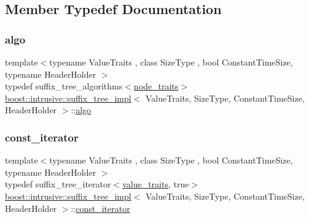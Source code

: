\subsection{Member Typedef Documentation}
\mbox{\label{classboost_1_1intrusive_1_1suffix__tree__impl_a3e079dda4e4422ad9c911470f3e8c7e2}} 
\subsubsection{\texorpdfstring{algo}{algo}}
{\footnotesize\ttfamily template$<$typename Value\+Traits , class Size\+Type , bool Constant\+Time\+Size, typename Header\+Holder $>$ \\
typedef suffix\+\_\+tree\+\_\+algorithms$<$\hyperlink{classboost_1_1intrusive_1_1suffix__tree__impl_a4fac695b2c8ea16789711a9840af44c4}{node\+\_\+traits}$>$ \hyperlink{classboost_1_1intrusive_1_1suffix__tree__impl}{boost\+::intrusive\+::suffix\+\_\+tree\+\_\+impl}$<$ Value\+Traits, Size\+Type, Constant\+Time\+Size, Header\+Holder $>$\+::\hyperlink{classboost_1_1intrusive_1_1suffix__tree__impl_a3e079dda4e4422ad9c911470f3e8c7e2}{algo}}

\mbox{\label{classboost_1_1intrusive_1_1suffix__tree__impl_a221fd6a26db0f6aa44951317caa66126}} 
\subsubsection{\texorpdfstring{const\+\_\+iterator}{const\_iterator}}
{\footnotesize\ttfamily template$<$typename Value\+Traits , class Size\+Type , bool Constant\+Time\+Size, typename Header\+Holder $>$ \\
typedef suffix\+\_\+tree\+\_\+iterator$<$\hyperlink{classboost_1_1intrusive_1_1suffix__tree__impl_a30d9e164c38c11cd38917ad14e9f3e88}{value\+\_\+traits}, true$>$ \hyperlink{classboost_1_1intrusive_1_1suffix__tree__impl}{boost\+::intrusive\+::suffix\+\_\+tree\+\_\+impl}$<$ Value\+Traits, Size\+Type, Constant\+Time\+Size, Header\+Holder $>$\+::\hyperlink{classboost_1_1intrusive_1_1suffix__tree__impl_a221fd6a26db0f6aa44951317caa66126}{const\+\_\+iterator}}

